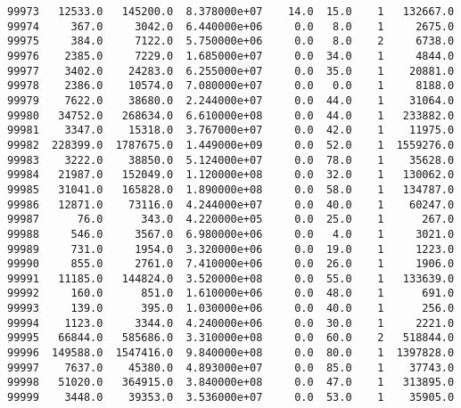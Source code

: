 \documentclass[11pt]{article}
\begin{document}
\begin{Verbatim}[commandchars=\\\{\}]
99973   12533.0   145200.0  8.378000e+07    14.0  15.0    1   132667.0  
99974     367.0     3042.0  6.440000e+06     0.0   8.0    1     2675.0  
99975     384.0     7122.0  5.750000e+06     0.0   8.0    2     6738.0  
99976    2385.0     7229.0  1.685000e+07     0.0  34.0    1     4844.0  
99977    3402.0    24283.0  6.255000e+07     0.0  35.0    1    20881.0  
99978    2386.0    10574.0  7.080000e+07     0.0   0.0    1     8188.0  
99979    7622.0    38680.0  2.244000e+07     0.0  44.0    1    31064.0  
99980   34752.0   268634.0  6.610000e+08     0.0  44.0    1   233882.0  
99981    3347.0    15318.0  3.767000e+07     0.0  42.0    1    11975.0  
99982  228399.0  1787675.0  1.449000e+09     0.0  52.0    1  1559276.0  
99983    3222.0    38850.0  5.124000e+07     0.0  78.0    1    35628.0  
99984   21987.0   152049.0  1.120000e+08     0.0  32.0    1   130062.0  
99985   31041.0   165828.0  1.890000e+08     0.0  58.0    1   134787.0  
99986   12871.0    73116.0  4.244000e+07     0.0  40.0    1    60247.0  
99987      76.0      343.0  4.220000e+05     0.0  25.0    1      267.0  
99988     546.0     3567.0  6.980000e+06     0.0   4.0    1     3021.0  
99989     731.0     1954.0  3.320000e+06     0.0  19.0    1     1223.0  
99990     855.0     2761.0  7.410000e+06     0.0  26.0    1     1906.0  
99991   11185.0   144824.0  3.520000e+08     0.0  55.0    1   133639.0  
99992     160.0      851.0  1.610000e+06     0.0  48.0    1      691.0  
99993     139.0      395.0  1.030000e+06     0.0  40.0    1      256.0  
99994    1123.0     3344.0  4.240000e+06     0.0  30.0    1     2221.0  
99995   66844.0   585686.0  3.310000e+08     0.0  60.0    2   518844.0  
99996  149588.0  1547416.0  9.840000e+08     0.0  80.0    1  1397828.0  
99997    7637.0    45380.0  4.893000e+07     0.0  85.0    1    37743.0  
99998   51020.0   364915.0  3.840000e+08     0.0  47.0    1   313895.0  
99999    3448.0    39353.0  3.536000e+07     0.0  53.0    1    35905.0  


\end{Verbatim}
\end{document}
